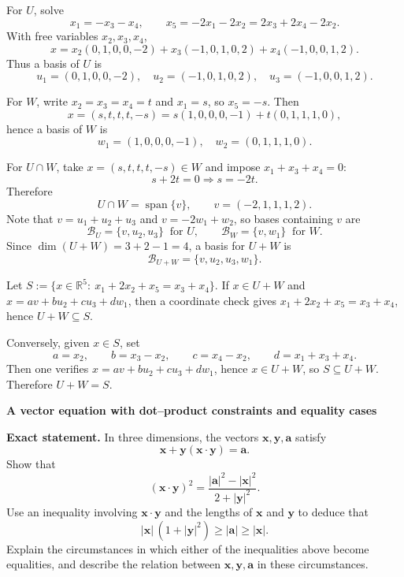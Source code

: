\begin{solution}
For $U$, solve
\[
x_1=-x_3-x_4,\qquad x_5=-2x_1-2x_2=2x_3+2x_4-2x_2.
\]
With free variables $x_2,x_3,x_4$,
\[
x=x_2(0,1,0,0,-2)+x_3(-1,0,1,0,2)+x_4(-1,0,0,1,2).
\]
Thus a basis of $U$ is
\[
u_1=(0,1,0,0,-2),\quad u_2=(-1,0,1,0,2),\quad u_3=(-1,0,0,1,2).
\]

For $W$, write $x_2=x_3=x_4=t$ and $x_1=s$, so $x_5=-s$. Then
\[
x=(s,t,t,t,-s)=s(1,0,0,0,-1)+t(0,1,1,1,0),
\]
hence a basis of $W$ is
\[
w_1=(1,0,0,0,-1),\quad w_2=(0,1,1,1,0).
\]

For $U\cap W$, take $x=(s,t,t,t,-s)\in W$ and impose $x_1+x_3+x_4=0$:
\[
s+2t=0\Rightarrow s=-2t.
\]
Therefore
\[
U\cap W=\operatorname{span}\{v\},\qquad v=(-2,1,1,1,2).
\]
Note that $v=u_1+u_2+u_3$ and $v=-2w_1+w_2$, so bases containing $v$ are
\[
\mathcal B_U=\{v,u_2,u_3\}\ \text{ for }U,\qquad \mathcal B_W=\{v,w_1\}\ \text{ for }W.
\]
Since $\dim(U+W)=3+2-1=4$, a basis for $U+W$ is
\[
\mathcal B_{U+W}=\{v,u_2,u_3,w_1\}.
\]

Let $S:=\{x\in\mathbb R^5:\ x_1+2x_2+x_5=x_3+x_4\}$.
If $x\in U+W$ and $x=a v+b u_2+c u_3+d w_1$, then a coordinate check gives
$x_1+2x_2+x_5=x_3+x_4$, hence $U+W\subseteq S$.

Conversely, given $x\in S$, set
\[
a=x_2,\qquad b=x_3-x_2,\qquad c=x_4-x_2,\qquad d=x_1+x_3+x_4.
\]
Then one verifies $x=a v+b u_2+c u_3+d w_1$, hence $x\in U+W$, so $S\subseteq U+W$.
Therefore $U+W=S$.

\bigskip
\end{solution}

\begin{problem}[CP-I-0093]
\label{prob:cp-i-0093}
\textbf{A vector equation with dot–product constraints and equality cases}

\textbf{Exact statement.}
\hspace*{1.5em}In three dimensions, the vectors \(\mathbf x,\mathbf y,\mathbf a\) satisfy
\[
\mathbf x+\mathbf y(\mathbf x\cdot \mathbf y)=\mathbf a.
\]
Show that
\[
(\mathbf x\cdot \mathbf y)^2=\frac{|\mathbf a|^2-|\mathbf x|^2}{2+|\mathbf y|^2}.
\]
Use an inequality involving \(\mathbf x\cdot \mathbf y\) and the lengths of \(\mathbf x\) and \(\mathbf y\) to deduce that
\[
|\mathbf x|\,(1+|\mathbf y|^2)\ge |\mathbf a|\ge |\mathbf x|.
\]
Explain the circumstances in which either of the inequalities above become equalities, and describe the relation between
\(\mathbf x,\mathbf y,\mathbf a\) in these circumstances.

\end{problem}

